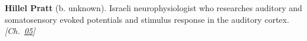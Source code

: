 \textbf{Hillel Pratt} (b. unknown). Israeli neurophysiologist who researches auditory and somatosensory evoked potentials and stimulus response in the auditory cortex. \emph{[Ch.~\hyperref[ch:circlewheel]{05}]}

